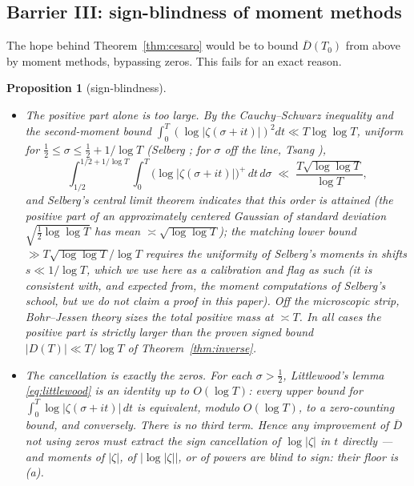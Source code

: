 \documentclass[11pt]{amsart}
\theoremstyle{plain}
\newtheorem{proposition}[theorem]{Proposition}
\theoremstyle{definition}
\theoremstyle{remark}
\begin{document}
\subsection{Barrier III: sign-blindness of moment methods}

The hope behind Theorem~\ref{thm:cesaro} would be to bound $\overline D(T_0)$ from above by moment methods, bypassing zeros. This fails for an exact reason.

\begin{proposition}[sign-blindness]\label{prop:signblind}
\begin{itemize}
\item[\textup{(a)}] \emph{The positive part alone is too large.} By the Cauchy--Schwarz inequality and the second-moment bound $\int_0^T(\log|\zeta(\sigma+it)|)^2dt\ll T\log\log T$, uniform for $\tfrac12\le\sigma\le\tfrac12+1/\log T$ \textup{(}Selberg \cite{Selberg1946}; for $\sigma$ off the line, Tsang \cite{Tsang1984}\textup{)},
\[
\int_{1/2}^{1/2+1/\log T}\!\!\int_0^T\bigl(\log|\zeta(\sigma+it)|\bigr)^+\,dt\,d\sigma\;\ll\;\frac{T\sqrt{\log\log T}}{\log T},
\]
and Selberg's central limit theorem indicates that this order is attained \textup{(}the positive part of an approximately centered Gaussian of standard deviation $\sqrt{\tfrac12\log\log T}$ has mean $\asymp\sqrt{\log\log T}$\textup{)}; the matching lower bound $\gg T\sqrt{\log\log T}/\log T$ requires the uniformity of Selberg's moments in shifts $s\ll1/\log T$, which we use here as a calibration and flag as such \textup{(}it is consistent with, and expected from, the moment computations of Selberg's school, but we do not claim a proof in this paper\textup{)}. Off the microscopic strip, Bohr--Jessen theory \cite{BohrJessen1930} sizes the total positive mass at $\asymp T$. In all cases the positive part is strictly larger than the proven signed bound $|D(T)|\ll T/\log T$ of Theorem~\ref{thm:inverse}.
\item[\textup{(b)}] \emph{The cancellation is exactly the zeros.} For each $\sigma>\tfrac12$, Littlewood's lemma \eqref{eq:littlewood} is an \emph{identity} up to $O(\log T)$: every upper bound for $\int_0^T\log|\zeta(\sigma+it)|\,dt$ is equivalent, modulo $O(\log T)$, to a zero-counting bound, and conversely. There is no third term. Hence any improvement of $\overline D$ not using zeros must extract the sign cancellation of $\log|\zeta|$ in $t$ directly --- and moments of $|\zeta|$, of $|{\log|\zeta|}|$, or of powers are blind to sign: their floor is \textup{(a)}.
\end{itemize}
\end{proposition}
\end{document}
